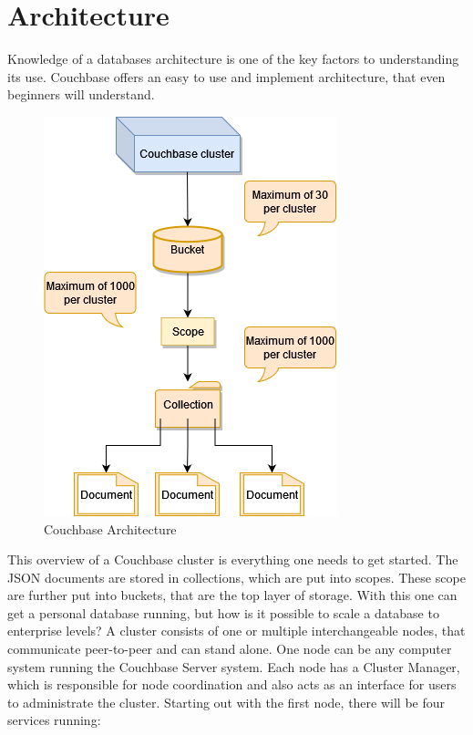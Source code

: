 \section{Architecture}
Knowledge of a databases architecture is one of the key factors to understanding its use. Couchbase offers an easy to use and implement architecture, that even beginners will understand.
\begin{figure}[H]
    \centering
        \includegraphics[scale=0.8]{images/CouchbaseArchitecture.drawio.png}
    \caption{Couchbase Architecture \parencite{CouchbaseArchitecture}}
    \label{fig:CouchbaseArchitecture}
\end{figure}
This overview of a Couchbase cluster is everything one needs to get started. The \ac{JSON} documents are stored in collections, which are put into scopes. These scope are further put into buckets, that are the top layer of storage. \parencite{CouchbaseIntroduction}\newline
With this one can get a personal database running, but how is it possible to scale a database to enterprise levels? A cluster consists of one or multiple interchangeable nodes, that communicate peer-to-peer and can stand alone. One node can be any computer system running the Couchbase Server system. \parencite{CouchbasePaper}\newline Each node has a Cluster Manager, which is responsible for node coordination and also acts as an interface for users to administrate the cluster. Starting out with the first node, there will be four services running:
